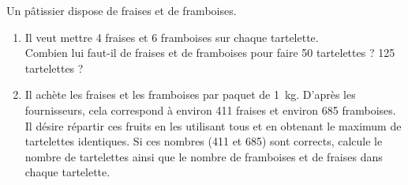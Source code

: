 
Un pâtissier dispose de fraises et de framboises.
\begin{enumerate}
  \item Il veut mettre 4 fraises et 6 framboises sur chaque tartelette.\\Combien lui faut-il de fraises et de framboises pour faire 50 tartelettes ? 125 tartelettes ?
  \item Il achète les fraises et les framboises par paquet de 1~kg. D'après les fournisseurs, cela correspond à environ 411 fraises et environ 685 framboises. Il désire répartir ces fruits en les utilisant tous et en obtenant le maximum de tartelettes identiques. Si ces nombres (411 et 685) sont corrects, calcule le nombre de tartelettes ainsi que le nombre de framboises et de fraises dans chaque tartelette.

\end{enumerate}
